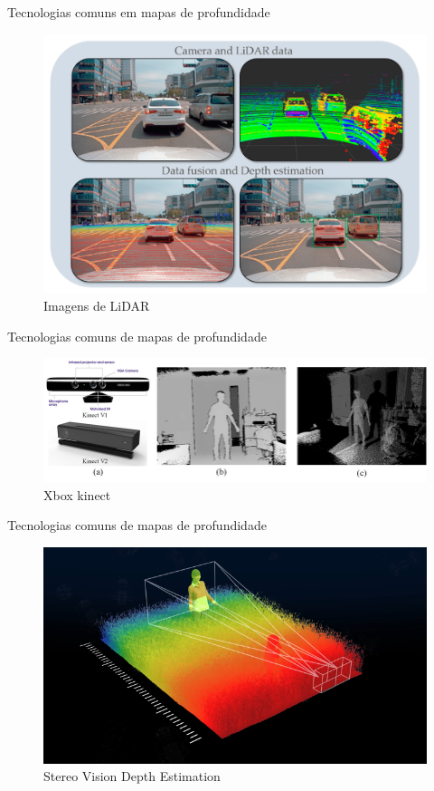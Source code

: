 \documentclass[aspectratio=169]{beamer}
\begin{document}
\begin{frame}{Tecnologias comuns em mapas de profundidade}
    \begin{figure}
        \centering
        \includegraphics[scale=.1]{figs/lidar.png}
        \caption{Imagens de LiDAR}
    \end{figure}
\end{frame}

\begin{frame}{Tecnologias comuns de mapas de profundidade}
    \begin{figure}
        \centering
        \includegraphics[width=\textwidth]{figs/a-Kinect-sensors-8-9-b-The-25D-depth-map-captured-by-Kinect-V2-c-The.png}
        \caption{Xbox kinect}
    \end{figure}
\end{frame}

\begin{frame}{Tecnologias comuns de mapas de profundidade}
    \begin{figure}
        \centering
        \includegraphics[width=.7\textwidth]{figs/CP_DM_SI_CR.png}
        \caption{Stereo Vision Depth Estimation}
    \end{figure}
\end{frame}
\end{document}
